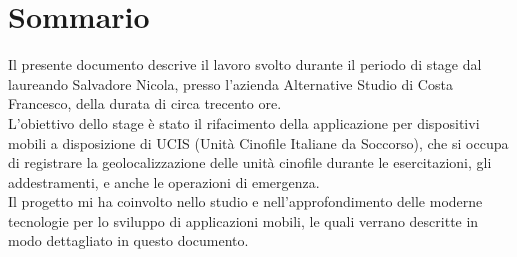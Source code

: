 
\cleardoublepage
{}
{}
\begingroup
\let\clearpage\relax
\let\cleardoublepage\relax
\let\cleardoublepage\relax

\chapter*{Sommario}

Il presente documento descrive il lavoro svolto durante il periodo di stage dal laureando Salvadore Nicola, presso l'azienda Alternative Studio
di Costa Francesco, della durata
di circa trecento ore.\\
\noindent L'obiettivo dello stage è stato il rifacimento della applicazione per
dispositivi mobili a disposizione di UCIS (Unità Cinofile Italiane da Soccorso), che si occupa di
registrare la geolocalizzazione delle unità cinofile durante le esercitazioni,
gli addestramenti, e anche le operazioni di emergenza. \\
\noindent Il progetto mi ha coinvolto nello studio e nell'approfondimento delle moderne tecnologie per lo sviluppo di applicazioni mobili,
le quali verrano descritte in modo dettagliato in questo documento.

%
%

\endgroup

\vfill
